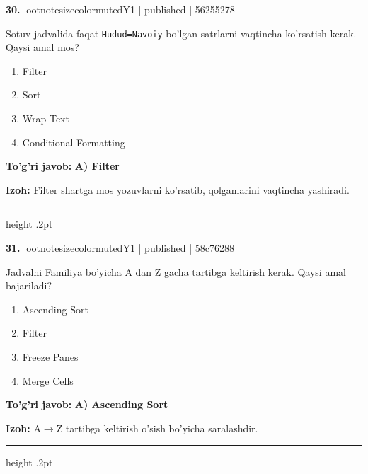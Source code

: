 \documentclass[10pt,a4paper]{article}
\begin{document}
\textbf{\color{ink}30.} {ootnotesizecolor{muted}Y1 | published | 56255278}
\par
Sotuv jadvalida faqat \texttt{Hudud=Navoiy} bo'lgan satrlarni vaqtincha ko'rsatish kerak. Qaysi amal mos?
\begin{enumerate}[label=\Alph*),leftmargin=9mm]
\item Filter
\item Sort
\item Wrap Text
\item Conditional Formatting
\end{enumerate}
\begin{tcolorbox}[enhanced,breakable,colback=teal!4,colframe=teal!55!black,boxrule=0.45pt,arc=1.2mm,left=2.8mm,right=2.8mm,top=2mm,bottom=2mm]
\textbf{\color{teal}To'g'ri javob:} \textbf{A) Filter}
\par\smallskip
\textbf{Izoh:} Filter shartga mos yozuvlarni ko'rsatib, qolganlarini vaqtincha yashiradi.
\end{tcolorbox}
\vspace{2mm}\hrule height .2pt\vspace{2mm}

\textbf{\color{ink}31.} {ootnotesizecolor{muted}Y1 | published | 58c76288}
\par
Jadvalni Familiya bo'yicha A dan Z gacha tartibga keltirish kerak. Qaysi amal bajariladi?
\begin{enumerate}[label=\Alph*),leftmargin=9mm]
\item Ascending Sort
\item Filter
\item Freeze Panes
\item Merge Cells
\end{enumerate}
\begin{tcolorbox}[enhanced,breakable,colback=teal!4,colframe=teal!55!black,boxrule=0.45pt,arc=1.2mm,left=2.8mm,right=2.8mm,top=2mm,bottom=2mm]
\textbf{\color{teal}To'g'ri javob:} \textbf{A) Ascending Sort}
\par\smallskip
\textbf{Izoh:} A\ensuremath{\rightarrow}Z tartibga keltirish o'sish bo'yicha saralashdir.
\end{tcolorbox}
\vspace{2mm}\hrule height .2pt\vspace{2mm}
\end{document}
